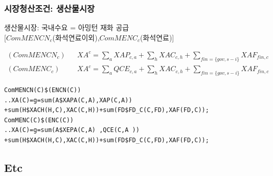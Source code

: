 \documentclass[10pt,compress,slidetop,%
			   hyperref={unicode},xcolor={svgnames},%
			   t]{beamer}
\begin{document}
\begin{frame}[fragile]
\frametitle{시장청산조건: 생산물시장}
\begin{small}
생산물시장: 국내수요 = 아밍턴 재화 공급\\

[$ComMENCN_c$(화석연료이외),$ComMENC_c$(화석연료)]

\begin{eqnarray*}
(ComMENCN_c)& & XA^c=\sum_a XAP_{c,a} +\sum_h XAC_{c,h}+\sum_{fin=\{gov,s-i\}} XAF_{fin,c}\\
(ComMENC_c)& & XA^c=\sum_a QCE_{c,a} +\sum_h XAC_{c,h}+\sum_{fin=\{gov,s-i\}} XAF_{fin,c}
\end{eqnarray*}

\begin{verbatim}
ComMENCN(C)$(ENCN(C))
..XA(C)=g=sum(A$XAPA(C,A),XAP(C,A))
+sum(H$XACH(H,C),XAC(C,H))+sum(FD$FD_C(C,FD),XAF(FD,C));
ComMENC(C)$(ENC(C))
..XA(C)=g=sum(A$XEPA(C,A) ,QCE(C,A ))
+sum(H$XACH(H,C),XAC(C,H))+sum(FD$FD_C(C,FD),XAF(FD,C));
\end{verbatim}
\end{small}
\end{frame}


\subsection{Etc}
\end{document}
